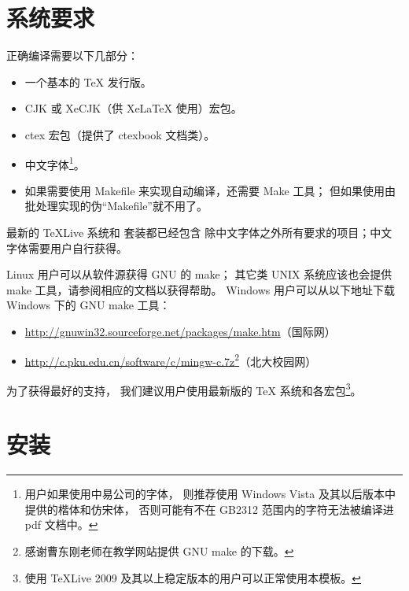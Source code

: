 	\section{系统要求}

	正确编译需要以下几部分：
	\begin{itemize}
		\item 一个基本的 \TeX{} 发行版。
		\item CJK 或 XeCJK（供 Xe\LaTeX{} 使用）宏包。
		\item ctex 宏包\cite{ctex,ctex-faq}（提供了 ctexbook 文档类）。
		\item 中文字体\footnote{%
			用户如果使用中易公司的字体，
			则推荐使用 Windows Vista 及其以后版本中提供的楷体和仿宋体，
			否则可能有不在 GB2312 范围内的字符无法被编译进 pdf 文档中。%
		}。
		\item 如果需要使用 Makefile 来实现自动编译，还需要 Make 工具；
			但如果使用由批处理实现的伪“Makefile”就不用了。
	\end{itemize}

	最新的 \TeX{}Live 系统和 \CTeX{} 套装都已经包含%
	除中文字体之外所有要求的项目；中文字体需要用户自行获得。

	Linux 用户可以从软件源获得 GNU 的 make；
	其它类 UNIX 系统应该也会提供 make 工具，请参阅相应的文档以获得帮助。%
	Windows 用户可以从以下地址下载 Windows 下的 GNU make 工具：
	\begin{itemize}
		\item
		\url{http://gnuwin32.sourceforge.net/packages/make.htm}（国际网）
		\item
		\url{http://c.pku.edu.cn/software/c/mingw-c.7z}\footnote%
		{感谢曹东刚老师在教学网站提供 GNU make 的下载。}（北大校园网）
	\end{itemize}

	为了获得最好的支持，
	我们建议用户使用最新版的 \TeX{} 系统和各宏包\footnote%
		{使用 \TeX{}Live 2009 及其以上稳定版本的用户可以正常使用本模板。}。

	\section{安装\label{sec:inst}}

